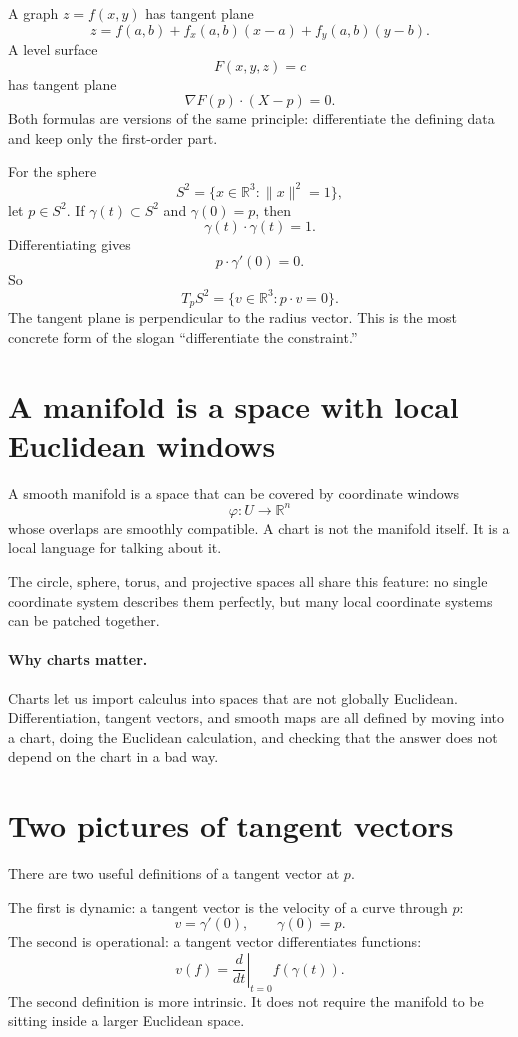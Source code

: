 A graph \(z=f(x,y)\) has tangent plane
\[
  z=f(a,b)+f_x(a,b)(x-a)+f_y(a,b)(y-b).
\]
A level surface
\[
  F(x,y,z)=c
\]
has tangent plane
\[
  \nabla F(p)\cdot(X-p)=0.
\]
Both formulas are versions of the same principle: differentiate the defining data and keep only the first-order part.

For the sphere
\[
  S^2=\{x\in\mathbb R^3:\|x\|^2=1\},
\]
let \(p\in S^2\). If \(\gamma(t)\subset S^2\) and \(\gamma(0)=p\), then
\[
  \gamma(t)\cdot\gamma(t)=1.
\]
Differentiating gives
\[
  p\cdot\gamma'(0)=0.
\]
So
\[
  T_pS^2=\{v\in\mathbb R^3:p\cdot v=0\}.
\]
The tangent plane is perpendicular to the radius vector. This is the most concrete form of the slogan ``differentiate the constraint.''

\section{A manifold is a space with local Euclidean windows}

A smooth manifold is a space that can be covered by coordinate windows
\[
  \varphi:U\to\mathbb R^n
\]
whose overlaps are smoothly compatible. A chart is not the manifold itself. It is a local language for talking about it.

The circle, sphere, torus, and projective spaces all share this feature: no single coordinate system describes them perfectly, but many local coordinate systems can be patched together.

\paragraph{Why charts matter.}
Charts let us import calculus into spaces that are not globally Euclidean. Differentiation, tangent vectors, and smooth maps are all defined by moving into a chart, doing the Euclidean calculation, and checking that the answer does not depend on the chart in a bad way.

\section{Two pictures of tangent vectors}

There are two useful definitions of a tangent vector at \(p\).

The first is dynamic: a tangent vector is the velocity of a curve through \(p\):
\[
  v=\gamma'(0),\qquad \gamma(0)=p.
\]
The second is operational: a tangent vector differentiates functions:
\[
  v(f)=\left.\frac{d}{dt}\right|_{t=0}f(\gamma(t)).
\]
The second definition is more intrinsic. It does not require the manifold to be sitting inside a larger Euclidean space.

